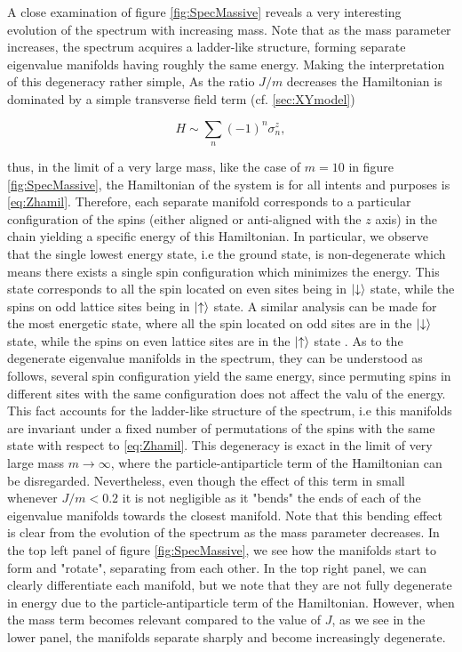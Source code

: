 A close examination of figure \ref{fig:SpecMassive} reveals a very interesting evolution of the spectrum with increasing mass. Note that as the mass parameter increases, the spectrum acquires a ladder-like structure, forming separate eigenvalue manifolds having roughly the same energy. Making the interpretation of this degeneracy rather simple, As the ratio $J/m$ decreases the Hamiltonian is dominated by a simple transverse field term (cf. \ref{sec:XYmodel}) 

\begin{equation}
H\sim \sum_n(-1)^n \sigma^z_n\label{eq:Zhamil},
\end{equation}


thus, in the limit of a very large mass, like the case of $m=10$ in figure \ref{fig:SpecMassive}, the Hamiltonian of the system is for all intents and purposes is \ref{eq:Zhamil}. Therefore, each separate manifold corresponds to a particular configuration of the spins (either aligned or anti-aligned with the $z$ axis) in the chain yielding a specific energy of this Hamiltonian. In particular, we observe that the single lowest energy state, i.e the ground state, is non-degenerate which means there exists a single spin configuration which minimizes the energy. This state corresponds to all the spin located on even sites being in $\ket{\downarrow}$ state, while the spins on odd lattice sites being in $\ket{\uparrow}$ state. A similar analysis can be made for the most energetic state, where all the spin located on odd sites are in the $\ket{\downarrow}$ state, while the spins on even lattice sites are in  the $\ket{\uparrow}$ state . As to the degenerate eigenvalue manifolds in the spectrum, they can be understood as follows,  several spin configuration yield the same energy, since permuting spins in different sites with the same configuration does not affect the valu of the energy. This fact accounts for the ladder-like structure of the spectrum, i.e this manifolds are invariant under a fixed number of permutations of the spins with the same state with respect to \eqref{eq:Zhamil}. This degeneracy is exact in the limit of very large mass $m\to\infty$, where the particle-antiparticle term of the Hamiltonian can be disregarded. Nevertheless, even though the effect of this term in small whenever $J/m<0.2$ it is not negligible as it "bends" the ends of each of the eigenvalue manifolds towards the closest manifold. Note that this bending effect is clear from the evolution of the spectrum as the mass parameter decreases. In the top left panel of figure \ref{fig:SpecMassive}, we see how the manifolds start to form and "rotate", separating from each other. In the top right panel, we can clearly differentiate each manifold, but we note that they are not fully degenerate in energy due to the particle-antiparticle term of the Hamiltonian. However, when the mass term becomes relevant compared to the value of $J$, as we see in the lower panel, the manifolds separate sharply and become increasingly degenerate.\\


